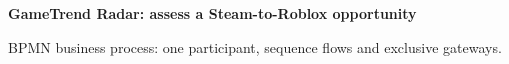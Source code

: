 \documentclass[10pt,a4paper,landscape]{article}
\begin{document}
\centering
{\Large\sffamily\bfseries GameTrend Radar: assess a Steam-to-Roblox opportunity\par}
\vspace{8mm}
\resizebox{\textwidth}{!}{}
\par\vspace{6mm}
{\sffamily BPMN business process: one participant, sequence flows and exclusive gateways.}
\end{document}
